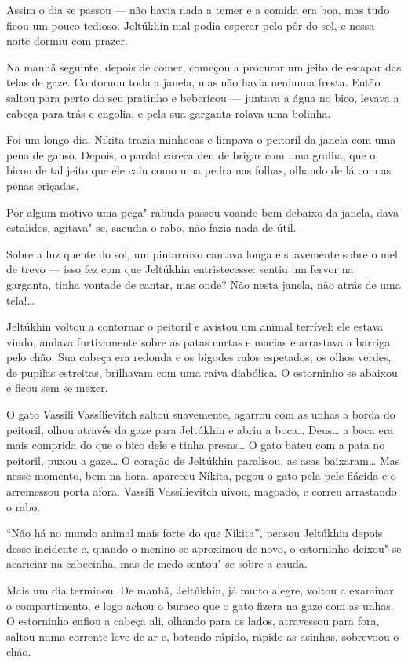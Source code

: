 Assim o dia se passou --- não havia nada a temer e a comida era boa, mas
tudo ficou um pouco tedioso. Jeltúkhin mal podia esperar pelo pôr do
sol, e nessa noite dormiu com prazer.

Na manhã seguinte, depois de comer, começou a procurar um jeito de
escapar das telas de gaze. Contornou toda a janela, mas não havia
nenhuma fresta. Então saltou para perto do seu pratinho e bebericou ---
juntava a água no bico, levava a cabeça para trás e engolia, e pela sua
garganta rolava uma bolinha.

Foi um longo dia. Nikita trazia minhocas e limpava o peitoril da janela
com uma pena de ganso. Depois, o pardal careca deu de brigar com uma
gralha, que o bicou de tal jeito que ele caiu como uma pedra nas folhas,
olhando de lá com as penas eriçadas.

Por algum motivo uma pega"-rabuda passou voando bem debaixo da janela,
dava estalidos, agitava"-se, sacudia o rabo, não fazia nada de útil.

Sobre a luz quente do sol, um pintarroxo cantava longa e suavemente
sobre o mel de trevo --- isso fez com que Jeltúkhin entristecesse:
sentiu um fervor na garganta, tinha vontade de cantar, mas onde? Não
nesta janela, não atrás de uma tela!\ldots{}

Jeltúkhin voltou a contornar o peitoril e avistou um animal terrível:
ele estava vindo, andava furtivamente sobre as patas curtas e macias e
arrastava a barriga pelo chão. Sua cabeça era redonda e os bigodes ralos
espetados; os olhos verdes, de pupilas estreitas, brilhavam com uma
raiva diabólica. O estorninho se abaixou e ficou sem se mexer.

O gato Vassíli Vassílievitch saltou suavemente, agarrou com as unhas a
borda do peitoril, olhou através da gaze para Jeltúkhin e abriu a
boca\ldots{} Deus\ldots{} a boca era mais comprida do que o bico dele e tinha
presas\ldots{} O gato bateu com a pata no peitoril, puxou a gaze\ldots{} O coração
de Jeltúkhin paralisou, as asas baixaram\ldots{} Mas nesse momento, bem na
hora, apareceu Nikita, pegou o gato pela pele flácida e o arremessou
porta afora. Vassíli Vassílievitch uivou, magoado, e correu arrastando o
rabo.

``Não há no mundo animal mais forte do que Nikita'', pensou Jeltúkhin
depois desse incidente e, quando o menino se aproximou de novo, o estorninho deixou"-se
acariciar na cabecinha, mas de medo sentou"-se sobre a cauda.

Mais um dia terminou. De manhã, Jeltúkhin, já muito alegre, voltou a
examinar o compartimento, e logo achou o buraco que o gato fizera na
gaze com as unhas. O estorninho enfiou a cabeça ali, olhando para os
lados, atravessou para fora, saltou numa corrente leve de ar e, batendo
rápido, rápido as asinhas, sobrevoou o chão.

